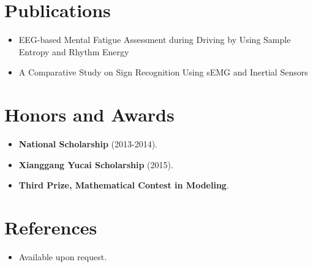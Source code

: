\documentclass[11pt,a4paper,sans]{moderncv}
\begin{document}

\section{Publications}
\vspace{1pt}
\begin{itemize}
\item {EEG-based Mental Fatigue Assessment during Driving by Using Sample Entropy and Rhythm Energy}
\item {A Comparative Study on Sign Recognition Using sEMG and Inertial Sensors}
\end{itemize}


\section{Honors and Awards}
\vspace{1pt}
\begin{itemize}
\item{\textbf{National Scholarship} (2013-2014).}
\item{\textbf{Xianggang Yucai Scholarship} (2015).}
\item{\textbf{Third Prize, Mathematical Contest in Modeling}.}
\end{itemize}


\section{References}
\vspace{1pt}
\begin{itemize}
\item{Available upon request.}
\end{itemize}
\end{document}
